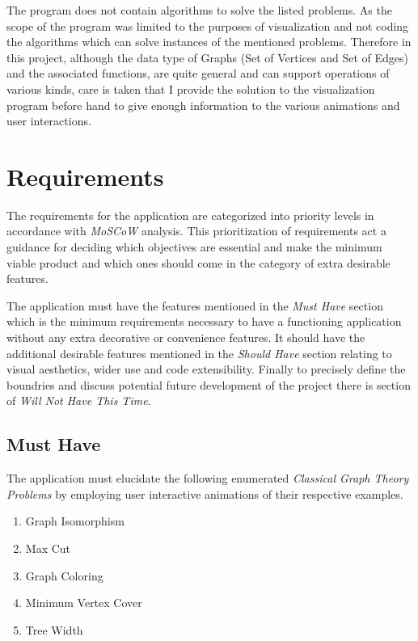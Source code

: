 The program does not contain algorithms to solve
the listed problems. As the scope of the program was limited to the purposes of
visualization and not coding the algorithms which can solve instances of the
mentioned problems.  Therefore in this project, although the data type of
Graphs (Set of Vertices and Set of Edges) and the associated functions, are
quite general and can support operations of various kinds, care is taken that I
provide the solution to the visualization program before hand to give enough
information to the various animations and user interactions.


\section{Requirements}
\label{requirements: requirements}

The requirements for the application are categorized into priority
levels in accordance with \emph{MoSCoW} analysis. This prioritization of
requirements act a guidance for deciding which objectives are essential and
make the minimum viable product and which ones should come in the category of
extra desirable features. \cite{Hudaib2018}

The application must have the features mentioned in the \emph{Must
Have} section which is the minimum requirements necessary to have a functioning
application without any extra decorative or convenience features. It should have the additional
desirable features mentioned in the \emph{Should Have} section relating to
visual aesthetics, wider use and code extensibility.  Finally to precisely
define the boundries and discuss potential future development of the project there is section of \emph{Will Not Have
This Time}.

\subsection{Must Have}
\label{requirements: musthave}
The application must elucidate the following enumerated \emph{Classical Graph Theory
Problems} by employing user interactive animations of their respective examples.
\begin{enumerate}
\item Graph Isomorphism
\item Max Cut
\item Graph Coloring
\item Minimum Vertex Cover
\item Tree Width
\end{enumerate}

